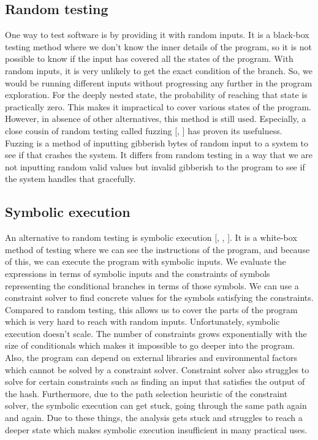 \documentclass[ runningheads,
               a4paper]{llncs}
\begin{document}
\subsection{Random testing}
One way to test software is by providing it with random inputs. It is a black-box testing method where we don't know the inner details of the program, so it is not possible to know if the input has covered all the states of the program. With random inputs, it is very unlikely to get the exact condition of the branch. So, we would be running different inputs without progressing any further in the program exploration. For the deeply nested state, the probability of reaching that state is practically zero. This makes it impractical to cover various states of the program. However, in absence of other alternatives, this method is still used. Especially, a close cousin of random testing called fuzzing [\cite{godefroid2020fuzzing}, \cite{miller1990empirical}] has proven its usefulness. Fuzzing is a method of inputting gibberish bytes of random input to a system to see if that crashes the system. It differs from random testing in a way that we are not inputting random valid values but invalid gibberish to the program to see if the system handles that gracefully.


\subsection{Symbolic execution}
An alternative to random testing is symbolic execution [\cite{king1976symbolic}, \cite{baldoni2018survey}, \cite{cadar2011symbolic}]. It is a white-box method of testing where we can see the instructions of the program, and because of this, we can execute the program with symbolic inputs. We evaluate the expressions in terms of symbolic inputs and the constraints of symbols representing the conditional branches in terms of those symbols. We can use a constraint solver to find concrete values for the symbols satisfying the constraints. Compared to random testing, this allows us to cover the parts of the program which is very hard to reach with random inputs. Unfortunately, symbolic execution doesn't scale. The number of constraints grows exponentially with the size of conditionals which makes it impossible to go deeper into the program. Also, the program can depend on external libraries and environmental factors which cannot be solved by a constraint solver. Constraint solver also struggles to solve for certain constraints such as finding an input that satisfies the output of the hash. Furthermore, due to the path selection heuristic of the constraint solver, the symbolic execution can get stuck, going through the same path again and again. Due to these things, the analysis gets stuck and struggles to reach a deeper state which makes symbolic execution insufficient in many practical uses.
\end{document}
